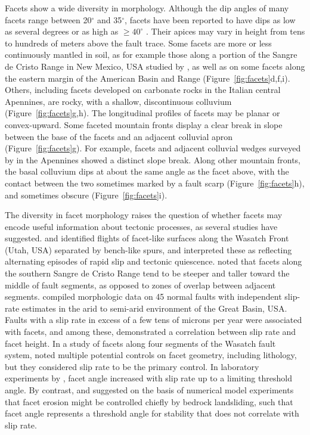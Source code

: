 Facets show a wide diversity in morphology. Although the dip angles of many facets range between 20$^\circ$ and 35$^\circ$, facets have been reported to have dips as low as several degrees \citep[e.g.,][]{menges1990soils,struble2019mountain} or as high as $\ge40^\circ$ \citep[e.g.,][]{wilkinson2015slip,struble2019mountain}. Their apices may vary in height from tens to hundreds of meters above the fault trace. Some facets are more or less continuously mantled in soil, as for example those along a portion of the Sangre de Cristo Range in New Mexico, USA studied by \citet{menges1990soils}, as well as on some facets along the eastern margin of the American Basin and Range (Figure~\ref{fig:facets}d,f,i). Others, including facets developed on carbonate rocks in the Italian central Apennines, are rocky, with a shallow, discontinuous colluvium \citep{tucker2011geomorphic} (Figure~\ref{fig:facets}g,h). The longitudinal profiles of facets may be planar or convex-upward. Some faceted mountain fronts display a clear break in slope between the base of the facets and an adjacent colluvial apron (Figure~\ref{fig:facets}g). For example, facets and adjacent colluvial wedges surveyed by \citet{bubeck2015tectonic} in the Apennines showed a distinct slope break. Along other mountain fronts, the basal colluvium dips at about the same angle as the facet above, with the contact between the two sometimes marked by a fault scarp (Figure~\ref{fig:facets}h), and sometimes obscure (Figure~\ref{fig:facets}i).

The diversity in facet morphology raises the question of whether facets may encode useful information about tectonic processes, as several studies have suggested. \citet{hamblin1976patterns} and \citet{anderson1977compound} identified flights of facet-like surfaces along the Wasatch Front (Utah, USA) separated by bench-like spurs, and interpreted these as reflecting alternating episodes of rapid slip and tectonic quiescence. \citet{menges1990soils} noted that facets along the southern Sangre de Cristo Range tend to be steeper and taller toward the middle of fault segments, as opposed to zones of overlap between adjacent segments. \citet{depolo2000estimating} compiled morphologic data on 45 normal faults with independent slip-rate estimates in the arid to semi-arid environment of the Great Basin, USA. Faults with a slip rate in excess of a few tens of microns per year were associated with facets, and among these, \citet{depolo2000estimating} demonstrated a correlation between slip rate and facet height. In a study of facets along four segments of the Wasatch fault system, \citet{zuchiewicz2000geometry} noted multiple potential controls on facet geometry, including lithology, but they considered slip rate to be the primary control. In laboratory experiments by \citet{strak2011interaction}, facet angle increased with slip rate up to a limiting threshold angle. By contrast, \citet{densmore1998landsliding} and \citet{ellis1999development} suggested on the basis of numerical model experiments that facet erosion might be controlled chiefly by bedrock landsliding, such that facet angle represents a threshold angle for stability that does not correlate with slip rate.

